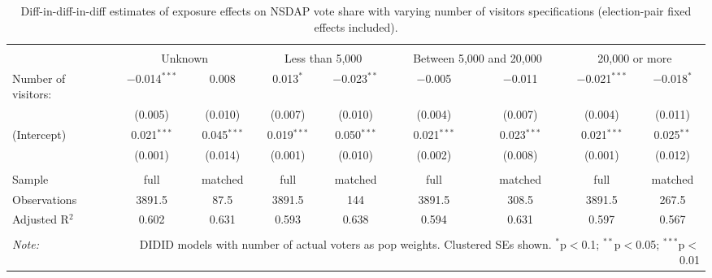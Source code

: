 
\begin{table}[!htbp] \centering 
  \caption{Diff-in-diff-in-diff estimates of exposure effects on NSDAP vote share with varying number of visitors specifications (election-pair fixed effects included).\vspace{-.25cm}} 
  \label{tab:nsdap-voteshare-numvisitors-dd} 
\scriptsize 
\begin{tabular}{@{\extracolsep{5pt}}lcccccccc} 
\\[-1.8ex]\hline 
\hline \\[-1.8ex] 
 & \multicolumn{2}{c}{Unknown} & \multicolumn{2}{c}{Less than 5,000} & \multicolumn{2}{c}{Between 5,000 and 20,000} & \multicolumn{2}{c}{20,000 or more} \\ 
 \cmidrule(r){2-3}\cmidrule(r){4-5}\cmidrule(r){6-7}\cmidrule(r){8-9}Number of visitors: & $-$0.014$^{***}$ & 0.008 & 0.013$^{*}$ & $-$0.023$^{**}$ & $-$0.005 & $-$0.011 & $-$0.021$^{***}$ & $-$0.018$^{*}$ \\ 
  & (0.005) & (0.010) & (0.007) & (0.010) & (0.004) & (0.007) & (0.004) & (0.011) \\ 
  (Intercept) & 0.021$^{***}$ & 0.045$^{***}$ & 0.019$^{***}$ & 0.050$^{***}$ & 0.021$^{***}$ & 0.023$^{***}$ & 0.021$^{***}$ & 0.025$^{**}$ \\ 
  & (0.001) & (0.014) & (0.001) & (0.010) & (0.002) & (0.008) & (0.001) & (0.012) \\ 
 \hline \\[-1.8ex] 
Sample & full & matched & full & matched & full & matched & full & matched \\ 
Observations & 3891.5 & 87.5 & 3891.5 & 144 & 3891.5 & 308.5 & 3891.5 & 267.5 \\ 
Adjusted R$^{2}$ & 0.602 & 0.631 & 0.593 & 0.638 & 0.594 & 0.631 & 0.597 & 0.567 \\ 
\hline 
\hline \\[-1.8ex] 
\textit{Note:}  & \multicolumn{8}{r}{DIDID models with number of actual voters as pop weights. Clustered SEs shown. $^{*}$p$<$0.1; $^{**}$p$<$0.05; $^{***}$p$<$0.01} \\ 
\end{tabular} 
\end{table} 
